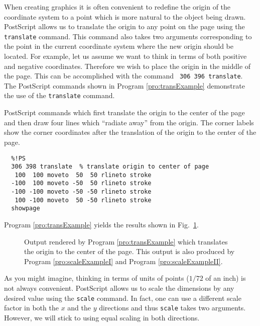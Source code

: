 When creating graphics it is often convenient to redefine the origin
of the coordinate system to a point which is more natural to the
object being drawn.  PostScript allows us to translate the origin to
any point on the page using the {\tt translate} command.  This command
also takes two arguments corresponding to the point in the current
coordinate system where the new origin should be located.  For
example, let us assume we want to think in terms of both positive and
negative coordinates.  Therefore we wish to place the origin in the
middle of the page.  This can be accomplished with the command {\tt
306 396 translate}.  The PostScript commands shown in Program
\ref{pro:transExample} demonstrate the use of the {\tt translate}
command.
\begin{program}
PostScript commands which first translate the origin to the center of
the page and then draw four lines which ``radiate away'' from the
origin.  The corner labels show the corner coordinates after the
translation of the origin to the center of the page.
\label{pro:transExample}
\codemiddle
\begin{verbatim}
  %!PS
  306 398 translate  % translate origin to center of page
   100  100 moveto  50  50 rlineto stroke
  -100  100 moveto -50  50 rlineto stroke
  -100 -100 moveto -50 -50 rlineto stroke
   100 -100 moveto  50 -50 rlineto stroke
  showpage
\end{verbatim}
\end{program}
Program \ref{pro:transExample} yields the results shown in Fig.\
\ref{fig:transExample}.
\begin{figure}
  \begin{center}
  \end{center} \caption{Output rendered by Program
  \ref{pro:transExample} which translates the origin to the center of the
  page.  This output is also produced by  Program
  \ref{pro:scaleExampleI} and  Program
  \ref{pro:scaleExampleII}.}  \label{fig:transExample}
\end{figure}

As you might imagine, thinking in terms of units of points ($1/72$ of
an inch) is not always convenient.  PostScript allows us to scale the
dimensions by any desired value using the {\tt scale} command.  In
fact, one can use a different scale factor in both the $x$ and the $y$
directions and thus {\tt scale} takes two arguments.  However, we will
stick to using equal scaling in both directions.

